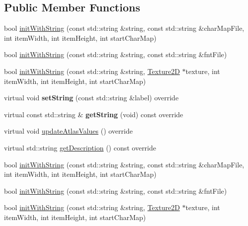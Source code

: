 \subsection*{Public Member Functions}
\begin{DoxyCompactItemize}
\item 
bool \hyperlink{classLabelAtlas_a69cf125f32f146c97c7d329ee935bfc0}{init\+With\+String} (const std\+::string \&string, const std\+::string \&char\+Map\+File, int item\+Width, int item\+Height, int start\+Char\+Map)
\item 
bool \hyperlink{classLabelAtlas_aa1c8b622cf511fec93dbc4c460f14d8d}{init\+With\+String} (const std\+::string \&string, const std\+::string \&fnt\+File)
\item 
bool \hyperlink{classLabelAtlas_a48d27c81829144f2e2e6644e56e065be}{init\+With\+String} (const std\+::string \&string, \hyperlink{classTexture2D}{Texture2D} $\ast$texture, int item\+Width, int item\+Height, int start\+Char\+Map)
\item 
\mbox{\label{classLabelAtlas_afa8ef0a21aca5b08045b91be46ce1a3a}} 
virtual void {\bfseries set\+String} (const std\+::string \&label) override
\item 
\mbox{\label{classLabelAtlas_a002102ed9e9c239407f0bbbf98547fca}} 
virtual const std\+::string \& {\bfseries get\+String} (void) const override
\item 
virtual void \hyperlink{classLabelAtlas_af70aa9b7820b00dfc6aa2c7291532fd6}{update\+Atlas\+Values} () override
\item 
virtual std\+::string \hyperlink{classLabelAtlas_aad009427295f2927b45a81a0f1af440d}{get\+Description} () const override
\item 
bool \hyperlink{classLabelAtlas_a69cf125f32f146c97c7d329ee935bfc0}{init\+With\+String} (const std\+::string \&string, const std\+::string \&char\+Map\+File, int item\+Width, int item\+Height, int start\+Char\+Map)
\item 
bool \hyperlink{classLabelAtlas_aa1c8b622cf511fec93dbc4c460f14d8d}{init\+With\+String} (const std\+::string \&string, const std\+::string \&fnt\+File)
\item 
bool \hyperlink{classLabelAtlas_a48d27c81829144f2e2e6644e56e065be}{init\+With\+String} (const std\+::string \&string, \hyperlink{classTexture2D}{Texture2D} $\ast$texture, int item\+Width, int item\+Height, int start\+Char\+Map)
\item 

\end{DoxyCompactItemize}
